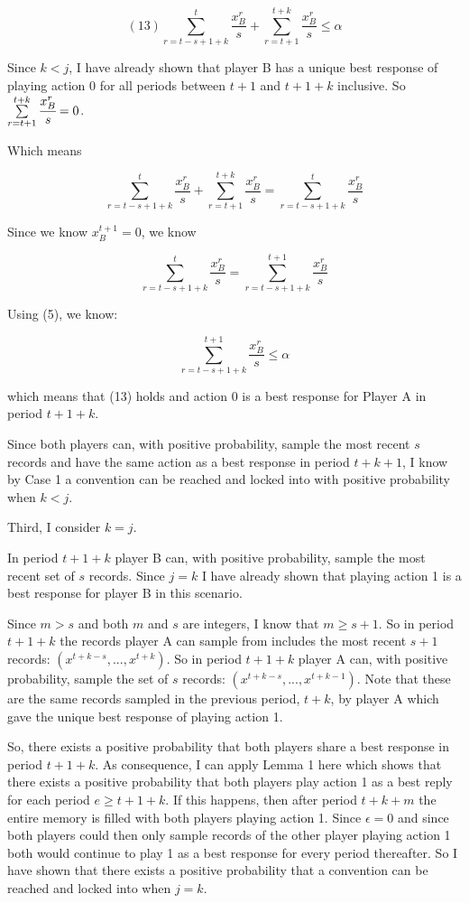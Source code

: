\documentclass{article}
\begin{document}
$$(13) \sum\limits_{r=t-s+1+k}^{t}\frac{x^r_B}{s}+\sum\limits_{r=t+1}^{t+k} \frac{x^r_B}{s} \leq \alpha$$

Since $k<j$, I have already shown that player B has a unique best response of playing action 0 for all periods between $t+1$ and $t+1+k$ inclusive. So $\sum\limits_{r=t+1}^{t+k} \cfrac{x^r_B}{s}=0$.

Which means 

$$\sum\limits_{r=t-s+1+k}^{t}\frac{x^r_B}{s}+\sum\limits_{r=t+1}^{t+k} \frac{x^r_B}{s}=\sum\limits_{r=t-s+1+k}^{t}\frac{x^r_B}{s}$$

Since we know $x^{t+1}_B = 0$, we know

$$\sum\limits_{r=t-s+1+k}^{t}\frac{x^r_B}{s} = \sum\limits_{r=t-s+1+k}^{t+1}\frac{x^r_B}{s}$$

Using (5), we know:

$$\sum\limits_{r=t-s+1+k}^{t+1} \frac{x^r_B}{s} \leq \alpha$$

which means that (13) holds and action 0 is a best response for Player A in period $t+1+k$.

\vskip6pt

Since both players can, with positive probability, sample the most recent $s$ records and have the same action as a best response in period $t+k+1$, I know by Case 1 a convention can be reached and locked into with positive probability when $k<j$.

\vskip18pt

Third, I consider $k=j$.

\vskip6pt

In period $t+1+k$ player B can, with positive probability, sample the most recent set of $s$ records. Since $j=k$ I have already shown that playing action 1 is a best response for player B in this scenario.

\vskip6pt

Since $m>s$ and both $m$ and $s$ are integers, I know that $m \geq s+1$. So in period $t+1+k$ the records player A can sample from includes the most recent $s+1$ records: $(x^{t+k-s},...,x^{t+k})$. So in period $t+1+k$ player A can, with positive probability, sample the set of $s$ records: $(x^{t+k-s},...,x^{t+k-1})$. Note that these are the same records sampled in the previous period, $t+k$, by player A which gave the unique best response of playing action 1.

\vskip6pt

So, there exists a positive probability that both players share a best response in period $t+1+k$. As consequence, I can apply Lemma 1 here which shows that there exists a positive probability that both players play action 1 as a best reply for each period $e \geq t+1+k$. If this happens, then after period $t+k+m$ the entire memory is filled with both players playing action 1. Since $\epsilon=0$ and since both players could then only sample records of the other player playing action 1 both would continue to play 1 as a best response for every period thereafter. So I have shown that there exists a positive probability that a convention can be reached and locked into when $j=k$. 
\end{document}
